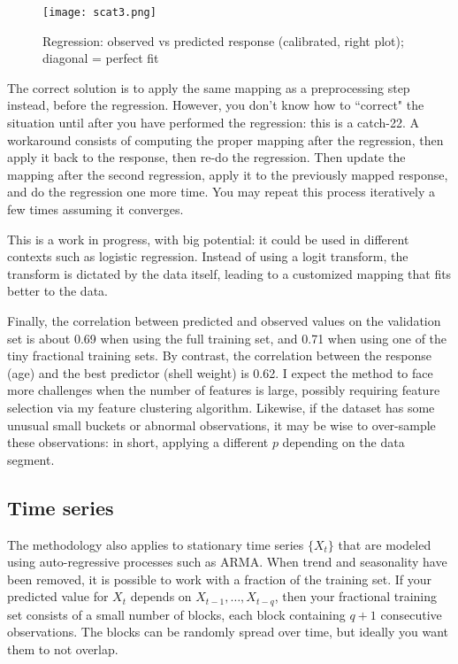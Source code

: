 \documentclass[oneside,10pt]{book}
\begin{document}
\begin{figure}[H]
\centering
\texttt{[image: scat3.png]}
\caption{Regression: observed vs predicted response (calibrated, right plot); diagonal = perfect fit}
\label{fig:prqerw76}
\end{figure}

The correct solution is to apply the same mapping as a preprocessing step instead, before the regression. However, you don't know how to ``correct" the situation until after you have performed the regression: this is a catch-22. A workaround consists of computing the proper
 mapping after the regression, then apply it back to the response, then re-do the regression. Then update the mapping after the second regression, apply it to the previously mapped response, and do the regression one more time. You may repeat this process iteratively a few times assuming it converges.

This is a work in progress, with big potential: it could be used in different contexts such as logistic regression. Instead of using a logit transform, the transform is dictated by the data itself, leading to a customized mapping that fits better to the data.

Finally, the correlation between predicted and observed values on the validation set is about 0.69 when using the full training set, and 0.71
 when using one of the tiny fractional training sets. By contrast, the correlation between the response (age) and the best
 predictor (shell weight) is 0.62. I expect the method to face more challenges when the number of features is large, possibly requiring feature selection via my feature clustering algorithm. Likewise, if the dataset has some unusual small buckets or abnormal observations, it may be wise
 to over-sample these observations: in short, applying a different $p$ depending on the data segment.





\subsection{Time series}

The methodology also applies to stationary time series $\{X_t\}$ that are modeled using auto-regressive processes such as ARMA. When trend and seasonality have been removed, it is possible to work with a fraction of the training set. If your predicted value for $X_t$ depends on $X_{t-1},\dots,X_{t-q}$, then your fractional training set consists of a small number of blocks, each block containing
 $q+1$ consecutive observations. The blocks can be randomly spread over time, but ideally you want them to not overlap.
\end{document}
